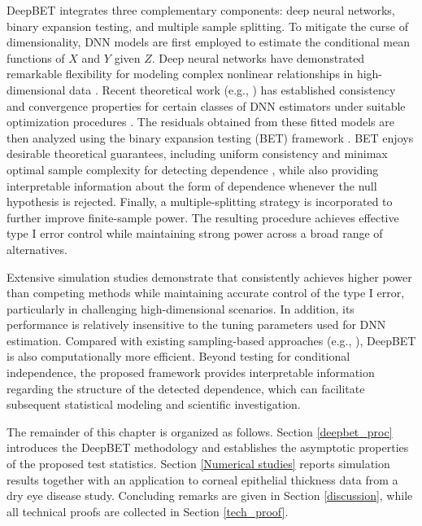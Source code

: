\documentclass[12pt,reqno,oneside]{amsbook}
\theoremstyle{definition}
\theoremstyle{remark}
\begin{document}
\hspace{0.5cm}
DeepBET integrates three complementary components: deep neural networks, binary expansion testing, and multiple sample splitting. To mitigate the curse of dimensionality, DNN models are first employed to estimate the conditional mean functions of $X$ and $Y$ given $Z$. Deep neural networks have demonstrated remarkable flexibility for modeling complex nonlinear relationships in high-dimensional data \cite{polson2018deep}. Recent theoretical work (e.g., \cite{Lu_2021,Bauer2019,schmidt2020nonparametric}) has established consistency and convergence properties for certain classes of DNN estimators under suitable optimization procedures \cite{Jentzen-JMLR-2022}. The residuals obtained from these fitted models are then analyzed using the binary expansion testing (BET) framework \cite{zhang2019bet}. BET enjoys desirable theoretical guarantees, including uniform consistency and minimax optimal sample complexity for detecting dependence \cite{zhang2019bet}, while also providing interpretable information about the form of dependence whenever the null hypothesis is rejected. Finally, a multiple-splitting strategy \cite{guo2024ranktransformed} is incorporated to further improve finite-sample power. The resulting procedure achieves effective type I error control while maintaining strong power across a broad range of alternatives.

\hspace{0.5cm}
Extensive simulation studies demonstrate that  \cite{pmlr-v258-yang25f} consistently achieves higher power than competing methods while maintaining accurate control of the type I error, particularly in challenging high-dimensional scenarios. In addition, its performance is relatively insensitive to the tuning parameters used for DNN estimation. Compared with existing sampling-based approaches (e.g., \cite{shi2021double,bellot2019conditional}), DeepBET is also computationally more efficient. Beyond testing for conditional independence, the proposed framework provides interpretable information regarding the structure of the detected dependence, which can facilitate subsequent statistical modeling and scientific investigation.

\hspace{0.5cm}
The remainder of this chapter is organized as follows. Section \ref{deepbet_proc} introduces the DeepBET methodology and establishes the asymptotic properties of the proposed test statistics. Section \ref{Numerical studies} reports simulation results together with an application to corneal epithelial thickness data from a dry eye disease study. Concluding remarks are given in Section \ref{discussion}, while all technical proofs are collected in Section \ref{tech_proof}.
\end{document}
